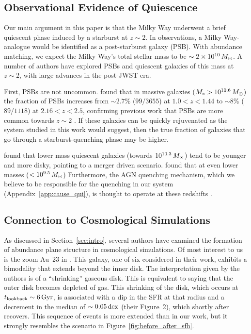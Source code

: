 \subsection{Observational Evidence of Quiescence}\label{ssec:obshiz}
Our main argument in this paper is that the Milky Way underwent a brief quiescent phase induced by a starburst at $z\sim2$. In observations, a Milky Way-analogue would be identified as a post-starburst galaxy (PSB). With abundance matching, we expect the Milky Way's total stellar mass to be $\sim2\times10^{10}\,M_{\odot}$. A number of authors have explored PSBs and quiescent galaxies of this mass at $z\sim2$, with large advances in the post-JWST era.

First, PSBs are not uncommon. \citet{2023ApJ...953..119P} found that in massive galaxies ($M_* > 10^{10.6}\,M_{\odot}$) the fraction of PSBs increases from $\sim2.7\%$ ($99/3655$) at $1.0 < z < 1.44$ to $\sim8\%$ ($89/1118$) at $2.16 < z < 2.5$, confirming previous work that PSBs are more common towards $z\sim2$ \citep[e.g.,][]{2016MNRAS.463..832W}. If these galaxies can be quickly rejuvenated as the system studied in this work would suggest, then the true fraction of galaxies that go through a starburst-quenching phase may be higher.

\citet{2023arXiv231215012C} found that lower mass quiescent galaxies (towards $10^{10.3}\,M_{\odot}$) tend to be younger and more disky, pointing to a merger driven scenario. \citet{2023arXiv231212207A} found that at even lower masses ($<10^{9.5}\,M_{\odot}$) Furthermore, the AGN quenching mechanism, which we believe to be responsible for the quenching in our system (Appendix~\ref{app:cause_qui}), is thought to operate at these redshifts \citep[e.g.][and references therein]{2023arXiv230805795B}.

\subsection{Connection to Cosmological Simulations}\label{ssec:cosmo}
As discussed in Section~\ref{sec:intro}, several authors have examined the formation of abundance plane structure in cosmological simulations. Of most interest to us is the zoom Au~23 in \citet{2018MNRAS.474.3629G}. This galaxy, one of six considered in their work, exhibits a bimodality that extends beyond the inner disk. The interpretation given by the authors is of a ``shrinking'' gaseous disk. This is equivalent to saying that the outer disk becomes depleted of gas. This shrinking of the disk, which occurs at $t_{\textrm{lookback}}\sim6\,\textrm{Gyr}$, is associated with a dip in the SFR at that radius and a decrement in the median \alphaFe{} of $\sim0.05\,\textrm{dex}$ (their Figure~2), which shortly after recovers. This sequence of events is more extended than in our work, but it strongly resembles the scenario in Figure~\ref{fig:before_after_sfh}.

